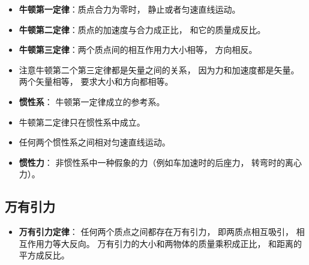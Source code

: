 \begin{itemize}
\item \textbf{牛顿第一定律}：质点合力为零时， 静止或者匀速直线运动。
\item \textbf{牛顿第二定律}：质点的加速度与合力成正比， 和它的质量成反比。
\item \textbf{牛顿第三定律}：两个质点间的相互作用力大小相等， 方向相反。
\item 注意牛顿第二个第三定律都是矢量之间的关系， 因为力和加速度都是矢量。 两个矢量相等， 要求大小和方向都相等。
\item \textbf{惯性系}： 牛顿第一定律成立的参考系。
\item 牛顿第二定律只在惯性系中成立。
\item 任何两个惯性系之间相对匀速直线运动。
\item \textbf{惯性力}： 非惯性系中一种假象的力（例如车加速时的后座力， 转弯时的离心力）。
\end{itemize}

\subsection{万有引力}
\begin{itemize}
\item \textbf{万有引力定律}： 任何两个质点之间都存在万有引力， 即两质点相互吸引， 相互作用力等大反向。 万有引力的大小和两物体的质量乘积成正比， 和距离的平方成反比。
\end{itemize}
